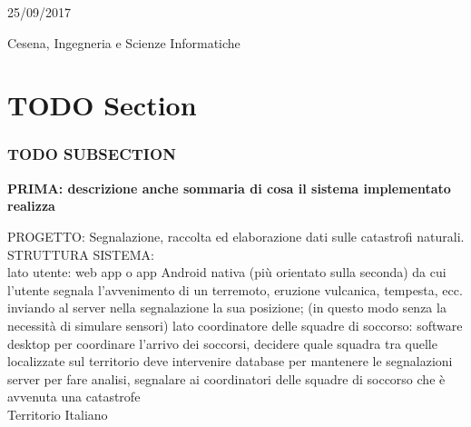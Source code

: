 \documentclass[10pt,english]{article}
\begin{document}
\begin{titlepage}
	\vspace{0.5\baselineskip} %
	
	
	\vfill %
	
	
	\vspace{0.3\baselineskip} %
	
	25/09/2017 %
	
	{\large Cesena, Ingegneria e Scienze Informatiche} %

\end{titlepage}

\section*{TODO Section}

\subsubsection*{TODO SUBSECTION}

\textbf{PRIMA: descrizione anche sommaria di cosa il sistema implementato realizza}

PROGETTO: Segnalazione, raccolta ed elaborazione dati sulle catastrofi naturali.\\

STRUTTURA SISTEMA:\\
lato utente: web app o app Android nativa (più orientato sulla seconda) da cui l’utente segnala l’avvenimento di un terremoto, eruzione vulcanica, tempesta, ecc. inviando al server nella segnalazione la sua posizione; (in questo modo senza la necessità di simulare sensori)
lato coordinatore delle squadre di soccorso: software desktop per coordinare l’arrivo dei soccorsi, decidere quale squadra tra quelle localizzate sul territorio deve intervenire
database per mantenere le segnalazioni
server per fare analisi, segnalare ai coordinatori delle squadre di soccorso che è avvenuta una catastrofe\\

Territorio Italiano\\
\end{document}
